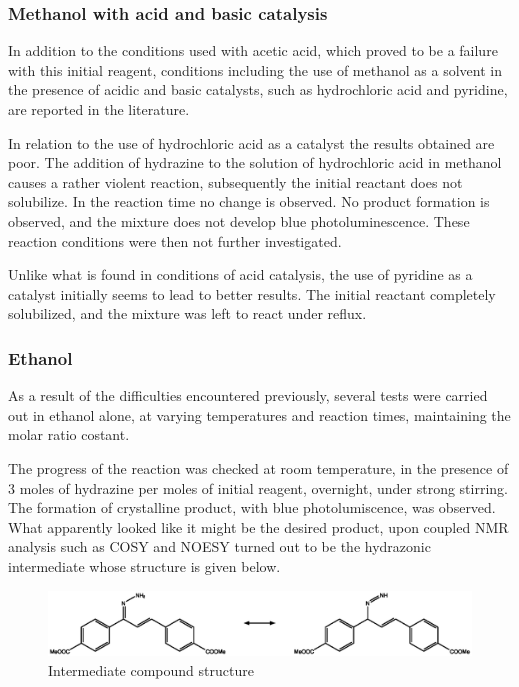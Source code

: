 \documentclass[../Master.tex]{subfiles}
\begin{document}
\subsubsection{Methanol with acid and basic catalysis}\label{sec:et-ac-bas}

In addition to the conditions used with acetic acid, which proved to be a failure with this initial reagent, conditions including the use of methanol as a solvent in the presence of acidic and basic catalysts, such as hydrochloric acid and pyridine, are reported in the literature.

In relation to the use of hydrochloric acid as a catalyst the results obtained are poor. The addition of hydrazine to the solution of hydrochloric acid in methanol causes a rather violent reaction, subsequently the initial reactant does not solubilize. In the reaction time no change is observed. No product formation is observed, and the mixture does not develop blue photoluminescence. These reaction conditions were then not further investigated.

Unlike what is found in conditions of acid catalysis, the use of pyridine as a catalyst initially seems to lead to better results.
The initial reactant completely solubilized, and the mixture was left to react under reflux.

\subsubsection{Ethanol}\label{sec:met-only}

As a result of the difficulties encountered previously, several tests were carried out in ethanol alone, at varying temperatures and reaction times, maintaining the molar ratio costant.

The progress of the reaction was checked at room temperature, in the presence of 3 moles of hydrazine per moles of initial reagent, overnight, under strong stirring. The formation of crystalline product, with blue photolumiscence, was observed. What apparently looked like it might be the desired product, upon coupled NMR analysis such as COSY and NOESY turned out to be the hydrazonic intermediate whose structure is given below.

\begin{figure}[h!]
	\centering
	\includegraphics[width=13cm,keepaspectratio]{Structures/idrazone.eps}
	\caption{Intermediate compound structure}
\end{figure}
\end{document}
